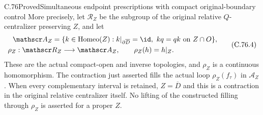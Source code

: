 \begin{claim}{C.76}{Proved}{Simultaneous endpoint prescriptions with compact original-boundary control}
More precisely, let $\mathscr R_Z$ be the subgroup of the
original relative $Q$-centralizer preserving $Z$, and let
\[
 \begin{split}
 \mathscr A_Z={}&\{k\in\operatorname{Homeo}(Z):
          k|_{\partial\overline D}=\id,
          \ kq=qk\text{ on }Z\cap O\},\\
 \rho_Z:\mathscr R_Z&\longrightarrow\mathscr A_Z,
                         \qquad \rho_Z(h)=h|_Z.
 \end{split}                                                   \tag{C.76.4}
\]
These are the actual compact-open and inverse topologies,
and $\rho_Z$ is a continuous homomorphism. The contraction
just asserted fills the actual loop $\rho_Z(f_\tau)$ in
$\mathscr A_Z$. When every complementary interval is
retained, $Z=\overline D$ and this is a contraction in the
original relative centralizer itself. No lifting of the
constructed filling through $\rho_Z$ is asserted for a
proper $Z$.
\end{claim}

